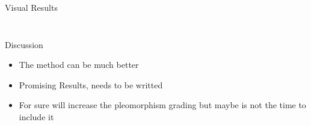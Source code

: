 \documentclass{beamer}
\begin{document}
\begin{frame}{Visual Results }
\begin{columns}
\begin{column}{0.5\textwidth}
{    }
    
    \end{column}
\end{columns}

    
\end{frame}


\begin{frame}{Discussion}
    \begin{itemize}
        \item The method can be much better
        \item Promising Results, needs to be writted
        \item For sure will increase the pleomorphism grading but maybe is not the time to include it
    \end{itemize}
\end{frame}
\end{document}
